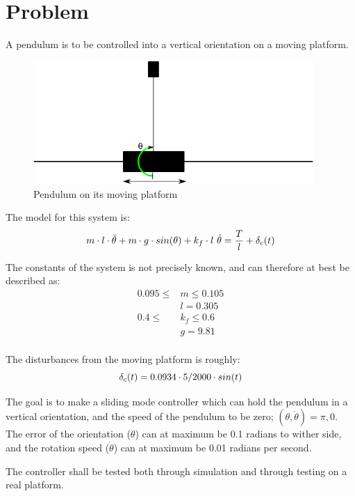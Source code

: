 \chapter{Problem}
A pendulum is to be controlled into a vertical orientation on a moving platform.
\begin{figure}[htbp]
        \centering
        \includegraphics[width=0.95\textwidth]{pendul.png}
        \caption{Pendulum on its moving platform}
        \label{fig:problem}
\end{figure}
The model for this system is:
\begin{equation}
        m\cdot l \cdot \Ddot{\theta} + m \cdot g \cdot sin(\theta) + k_f \cdot l \ \dot{\theta} = \frac{T}{l} + \delta_c(t)
\end{equation}

The constants of the system is not precisely known, and can therefore at best be described as:
\begin{equation}
        \begin{split}
                0.095 \leq &m \leq 0.105 \\
                &l = 0.305 \\
                0.4 \leq &k_f \leq 0.6 \\
                &g = 9.81 \\
        \end{split}
\end{equation}

The disturbances from the moving platform is roughly:
\begin{equation}
        \delta_c(t) = 0.0934 \cdot 5/2000 \cdot sin(t)
\end{equation}

The goal is to make a sliding mode controller which can hold the pendulum in a vertical orientation, and the speed of the pendulum to be zero; $(\theta, \dot{\theta})= \pi, 0$. The error of the orientation ($\theta$) can at maximum be 0.1 radians to wither side, and the rotation speed ($\dot{\theta}$) can at maximum be 0.01 radians per second.

The controller shall be tested both through simulation and through testing on a real platform.